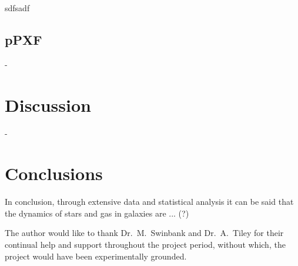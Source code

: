 \documentclass[12pt, twocolumn]{revtex4}    %
\begin{document}
\twocolumngrid

sdfsadf

\subsection{pPXF} 

-

\section{Discussion} 

-

\section{Conclusions}
 
In conclusion, through extensive data and statistical analysis it can be said that the dynamics of stars and gas in galaxies are ... (?) 

\begin{acknowledgments}
The author would like to thank Dr.~M.~Swinbank and Dr.~A.~Tiley for their continual help and support throughout the project period, without which, the project would have been experimentally grounded.
\end{acknowledgments}



\end{document}
